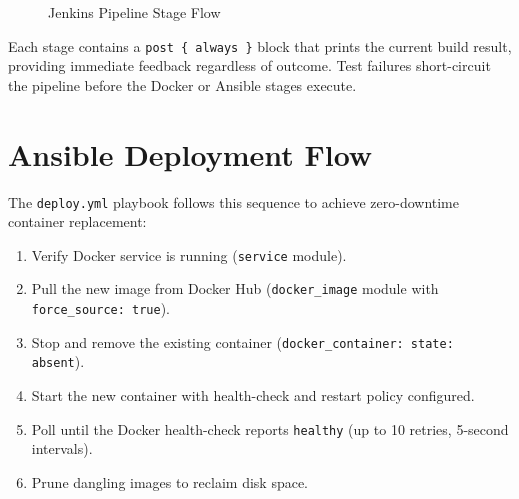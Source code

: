 \documentclass[12pt,a4paper]{report}
\begin{document}
\begin{figure}[H]
\centering
{}
\caption{Jenkins Pipeline Stage Flow}
\label{fig:jenkins_flow}
\end{figure}

Each stage contains a \texttt{post \{ always \}} block that prints the current build result, providing immediate feedback regardless of outcome. Test failures short-circuit the pipeline before the Docker or Ansible stages execute.

\section{Ansible Deployment Flow}
The \texttt{deploy.yml} playbook follows this sequence to achieve zero-downtime container replacement:

\begin{enumerate}
    \item Verify Docker service is running (\texttt{service} module).
    \item Pull the new image from Docker Hub (\texttt{docker\_image} module with \texttt{force\_source: true}).
    \item Stop and remove the existing container (\texttt{docker\_container: state: absent}).
    \item Start the new container with health-check and restart policy configured.
    \item Poll until the Docker health-check reports \texttt{healthy} (up to 10 retries, 5-second intervals).
    \item Prune dangling images to reclaim disk space.
\end{enumerate}
\end{document}
